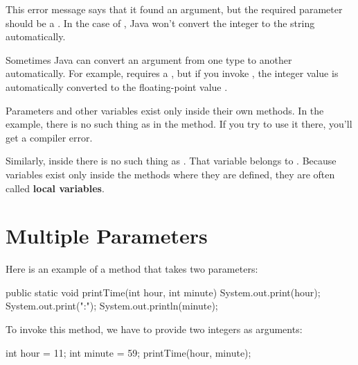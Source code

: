 This error message says that it found an  argument, but the required parameter should be a .
In the case of , Java won't convert the integer  to the string  automatically.


Sometimes Java can convert an argument from one type to another automatically.
For example,  requires a , but if you invoke , the integer value  is automatically converted to the floating-point value .


Parameters and other variables exist only inside their own methods.
In the  example, there is no such thing as  in the  method.
If you try to use it there, you'll get a compiler error.

Similarly, inside  there is no such thing as .
That variable belongs to .
Because variables exist only inside the methods where they are defined, they are often called {\bf local variables}.


\section{Multiple Parameters}
\label{multparam}


Here is an example of a method that takes two parameters:

\begin{code}
public static void printTime(int hour, int minute) {
    System.out.print(hour);
    System.out.print(":");
    System.out.println(minute);
}
\end{code}

%
%

To invoke this method, we have to provide two integers as arguments:

\begin{code}
int hour = 11;
int minute = 59;
printTime(hour, minute);
\end{code}

